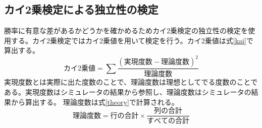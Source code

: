 \subsection{カイ2乗検定による独立性の検定}
勝率に有意な差があるかどうかを確かめるためカイ2乗検定の独立性の検定を使用する。カイ2乗検定ではカイ2乗値を用いて検定を行う。カイ2乗値は式\ref{kai}で算出する。
\begin{equation} カイ2乗値 = \sum{ \frac{(実現度数 - 理論度数)^2}{理論度数}} \label{kai}\end{equation}
実現度数とは実際に出た度数のことで、理論度数は理想としてでる度数のことである。実現度数はシミュレータの結果から参照し、理論度数はシミュレータの結果から算出する。
理論度数は式\ref{theory}で計算される。
\begin{equation} 理論度数 =  行の合計 ×\frac{列の合計}{すべての合計} \label{theory}\end{equation}
